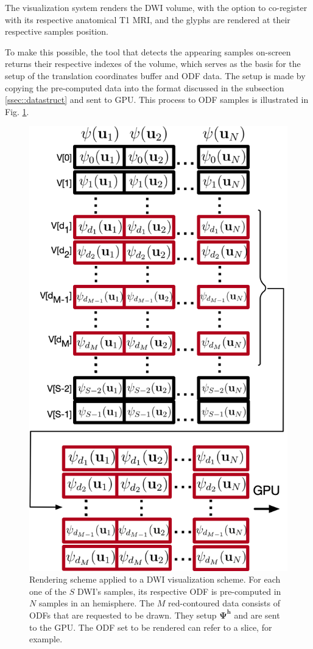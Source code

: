 \documentclass[twoside,twocolumn,10pt]{article}
\begin{document}
The visualization system renders the DWI volume, with the option to co-register with its respective anatomical T1 MRI, and the glyphs are rendered at their respective samples position.

To make this possible, the tool that detects the appearing samples on-screen returns their respective indexes of the volume, which serves as the basis for the setup of the translation coordinates buffer and ODF data. The setup is made by copying the pre-computed data into the format discussed in the subsection \ref{ssec::datastruct} and sent to GPU. This process to ODF samples is illustrated in Fig. \ref{fig::vmtk_precomputed2GPU}.

\begin{figure}[ht]
    \centering
    \includegraphics[width=0.89\linewidth, angle=0]{figs/rendering_scheme/organizacao2GPU_red1.png}
    \caption{Rendering scheme applied to a DWI visualization scheme. For each one of the $S$ DWI's samples, its respective ODF is pre-computed in $N$ samples in an hemisphere. The $M$ red-contoured data consists of ODFs that are requested to be drawn. They setup $\bm{\Psi}^{\bm{h}}$ and are sent to the GPU. The ODF set to be rendered can refer to a slice, for example.}
    \label{fig::vmtk_precomputed2GPU}
\end{figure}
\end{document}
